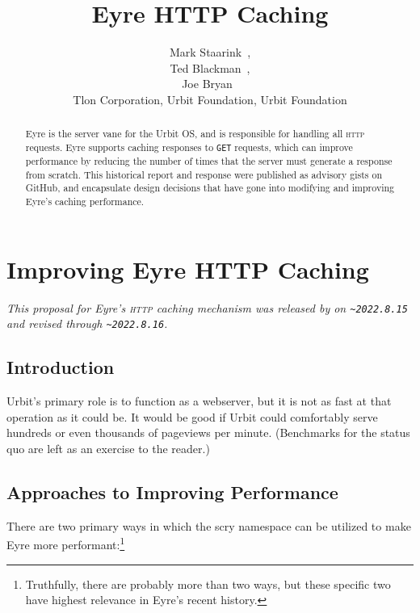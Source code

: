 \documentclass[twoside]{article}
\title{Eyre HTTP Caching}
\author{Mark Staarink~\patp{palfun-foslup}, \\ Ted Blackman~\patp{rovyns-ricfer}, \\ Joe Bryan~\patp{master-morzod} \\ Tlon Corporation, Urbit Foundation, Urbit Foundation}
\date{}
\begin{document}
\maketitle
\thispagestyle{firststyle}

\begin{abstract}
  Eyre is the server vane for the Urbit OS, and is responsible for handling all \textsc{http} requests.  Eyre supports caching responses to \texttt{GET} requests, which can improve performance by reducing the number of times that the server must generate a response from scratch.  This historical report and response were published as advisory gists on GitHub, and encapsulate design decisions that have gone into modifying and improving Eyre's caching performance.
\end{abstract}

\setcounter{page}{103}

\tableofcontents

\section[Improving Eyre \textsc{http} Caching]{Improving Eyre HTTP Caching}

\noindent\sloppy
\emph{This proposal for Eyre's \textsc{http} caching mechanism was released by  on \texttt{\textasciitilde 2022.8.15} and revised through \texttt{\textasciitilde 2022.8.16}.}

\subsection{Introduction}

Urbit's primary role is to function as a webserver, but it is not as fast at that operation as it could be.  It would be good if Urbit could comfortably serve hundreds or even thousands of pageviews per minute.  (Benchmarks for the status quo are left as an exercise to the reader.)

\subsection{Approaches to Improving Performance}

There are two primary ways in which the scry namespace can be utilized to make Eyre more performant:\footnote{Truthfully, there are probably more than two ways, but these specific two have highest relevance in Eyre's recent history.}
\end{document}
